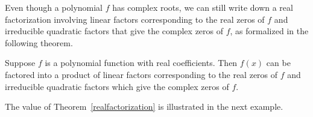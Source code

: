 Even though a polynomial $f$ has complex roots, we can still write down a real factorization involving linear factors corresponding to the real zeros of $f$ and irreducible quadratic factors that give the complex zeros of $f$, as formalized in the following theorem. 

\begin{theorem}
\label{realfactorization}
Suppose $f$ is a polynomial function with real coefficients.  Then $f(x)$ can be factored into a product of linear factors corresponding to the real zeros of $f$ and irreducible quadratic factors which give the complex zeros of $f$. 
\end{theorem}



The value of Theorem~\ref{realfactorization} is illustrated in the next example.
%
%
%
%
%
%
%
%
%
%  
%
%
%
%
